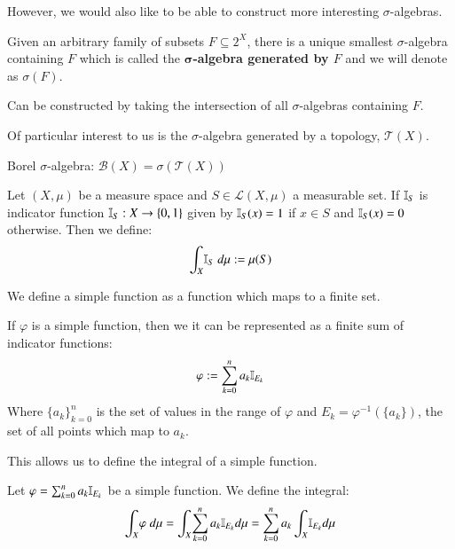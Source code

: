 However, we would also like to be able to construct more interesting $\sigma$-algebras.

\begin{definition}
Given an arbitrary family of subsets $F \subseteq 2^X$, there is a unique smallest $\sigma$-algebra containing $F$ which is called the \textbf{$\mathbf{\sigma}$-algebra generated by $F$} and we will denote as $\sigma(F)$.
\end{definition}

Can be constructed by taking the intersection of all $\sigma$-algebras containing $F$.

Of particular interest to us is the $\sigma$-algebra generated by a topology, $\mathcal{T}(X)$. 

Borel $\sigma$-algebra: $\mathcal{B}(X) = \sigma(\mathcal{T}(X))$

\begin{definition}
Let $(X, \mu )$ be a measure space and $S \in \mathcal{L}(X, \mu)$ a measurable set. If $\ind[S]$ is indicator function $\ind[S] : X \to \{ 0, 1 \}$ given by $\ind[S] (x) = 1$ if $x \in S$ and $\ind[S] (x) = 0$ otherwise.
Then we define:
\begin{equation}
\int_X \! \ind[S] \; d \mu := \mu ( S )
\end{equation}
\end{definition}

We define a simple function as a function which maps to a finite
set.
\begin{theorem}
If $\varphi$ is a simple function, then we it can be represented as a finite sum of indicator functions:
\begin{equation}
\varphi := \sum_{k=0}^n a_k \ind[E_k]
\end{equation}
Where $\{ a_k \}_{k=0}^n$ is the set of values in the range of $\varphi$ and $E_k = \varphi^{-1}( \{ a_k \} )$, the set of all points which map to $a_k$.
\end{theorem}

This allows us to define the integral of a simple function.

\begin{definition}
Let $\varphi = \sum_{k=0}^n a_k \ind[E_k]$ be a simple function. We define the integral:
\begin{equation}
\int_X \! \varphi \; d \mu = \int_X \! \sum_{k=0}^n a_k \ind[E_k] d \mu = \sum_{k=0}^n a_k  \int_X \! \ind[E_k] d \mu
\end{equation}
\end{definition}

